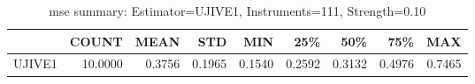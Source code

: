\begin{table}[ht]
\centering
\caption{mse summary: Estimator=UJIVE1, Instruments=111, Strength=0.10}
\begin{tabular}{lrrrrrrrr}
\toprule
 & COUNT & MEAN & STD & MIN & 25\% & 50\% & 75\% & MAX \\
\midrule
UJIVE1 & 10.0000 & 0.3756 & 0.1965 & 0.1540 & 0.2592 & 0.3132 & 0.4976 & 0.7465 \\
\bottomrule
\end{tabular}
\end{table}
